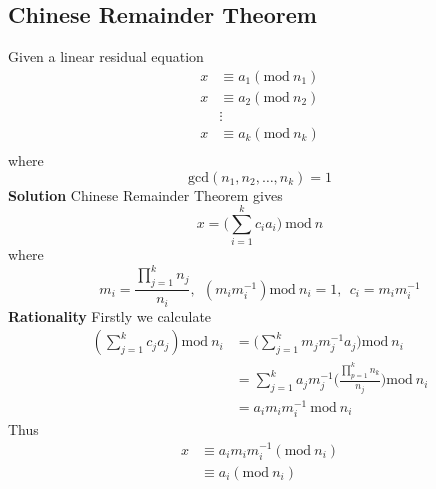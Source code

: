 \documentclass[11pt]{article}
\begin{document}
\subsection{Chinese Remainder Theorem}
Given a linear residual equation 
\begin{equation}
\begin{aligned}
    x &\equiv a_1 (\text{mod}~n_1) \\
    x &\equiv a_2 (\text{mod}~n_2) \\
      &\vdots \\
    x &\equiv a_k (\text{mod}~n_k) \\
\end{aligned}
\end{equation}
where
\begin{equation}
    \text{gcd}( n_1, n_2,\dots,n_k) = 1
\end{equation}
\textbf{Solution} Chinese Remainder Theorem gives
\begin{equation}
    x = \bigg(\sum_{i=1}^k c_i a_i\bigg)~\text{mod}~n
\end{equation}
where
\begin{equation}
    m_i = \frac{\prod_{j=1}^k n_j}{n_i},~~(m_im_i^{-1})\text{mod}~n_i = 1,~~c_i = m_im_i^{-1}
\end{equation}
\textbf{Rationality} Firstly we calculate
\begin{equation}
\begin{aligned}
    (\sum_{j=1}^k c_j a_j) \text{mod}~n_i &= \bigg(\sum_{j=1}^k m_jm_j^{-1}a_j\bigg)\text{mod}~n_i\\
    &= \sum_{j=1}^k a_jm_j^{-1}\bigg(\frac{\prod_{p=1}^{k}n_k}{n_j}\bigg)\text{mod}~n_i \\
    &= a_i m_i m_i^{-1}~\text{mod}~n_i
\end{aligned}
\end{equation}
Thus
\begin{equation}
\begin{aligned}
    x &\equiv a_im_im_i^{-1} (\text{mod}~n_i) \\
      &\equiv a_i (\text{mod}~n_i)
\end{aligned}
\end{equation}
\end{document}
